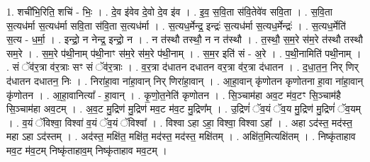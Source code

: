 \documentclass[17pt]{extarticle}
\begin{document}
1. शची॑भि॒रिति॒ शचि॑ - भिः॒ । . दे॒व इ॑वेव दे॒वो दे॒व इ॑व । . इ॒व॒ स॒वि॒ता स॑वि॒तेवे॑व सवि॒ता । . स॒वि॒ता स॒त्यध॑र्मा स॒त्यध॑र्मा सवि॒ता स॑वि॒ता स॒त्यध॑र्मा । . स॒त्यध॒र्मेन्द्र॒ इन्द्रः॑ स॒त्यध॑र्मा स॒त्यध॒र्मेन्द्रः॑ । . स॒त्यध॒र्मेति॑ स॒त्य - ध॒र्मा॒ । . इन्द्रो॒ न नेन्द्र॒ इन्द्रो॒ न । . न त॑स्थौ तस्थौ॒ न न त॑स्थौ । . त॒स्थौ॒ स॒म॒रे स॑म॒रे त॑स्थौ तस्थौ सम॒रे । . स॒म॒रे प॑थी॒नाम् प॑थी॒नाꣳ स॑म॒रे स॑म॒रे प॑थी॒नाम् । . स॒म॒र इति॑ सं - अ॒रे । . प॒थी॒नामिति॑ पथी॒नाम् । . सं ॅव॑र॒त्रा व॑र॒त्राः सꣳ सं ॅव॑र॒त्राः । . व॒र॒त्रा द॑धातन दधातन वर॒त्रा व॑र॒त्रा द॑धातन । . द॒धा॒त॒न॒ निर् णिर् द॑धातन दधातन॒ निः । . निरा॑हा॒वा ना॑हा॒वान् निर् णिरा॑हा॒वान् । . आ॒हा॒वान् कृ॑णोतन कृणोतना हा॒वा ना॑हा॒वान् कृ॑णोतन । . आ॒हा॒वानित्या᳚ - हा॒वान् । . कृ॒णो॒त॒नेति॑ कृणोतन । . सि॒ञ्चाम॑हा अव॒ट म॑व॒टꣳ सि॒ञ्चाम॑है सि॒ञ्चाम॑हा अव॒टम् । . अ॒व॒ट मु॒द्रिण॑ मु॒द्रिण॑ मव॒ट म॑व॒ट मु॒द्रिण᳚म् । . उ॒द्रिणं॑ ॅव॒यं ॅव॒य मु॒द्रिण॑ मु॒द्रिणं॑ ॅव॒यम् । . व॒यं ॅविश्वा॒ विश्वा॑ व॒यं ॅव॒यं ॅविश्वा᳚ । . विश्वा ऽहा ऽहा॒ विश्वा॒ विश्वा ऽहा᳚ । . अहा ऽद॑स्त॒ मद॑स्त॒ महा ऽहा ऽद॑स्तम् । . अद॑स्त॒ मक्षि॑त॒ मक्षि॑त॒ मद॑स्त॒ मद॑स्त॒ मक्षि॑तम् । . अक्षि॑त॒मित्यक्षि॑तम् । . निष्कृ॑ताहाव मव॒ट म॑व॒टम् निष्कृ॑ताहाव॒म् निष्कृ॑ताहाव मव॒टम् । \newline
\end{document}
